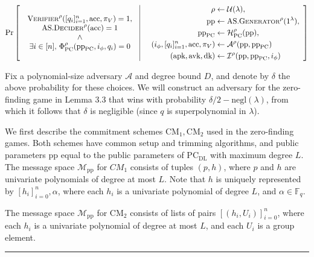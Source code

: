 \documentclass[
]{article}
\newcommand*\Fb{\mathbb{F}}
\newcommand*\Ac{\mathcal{A}}
\newcommand*\Uc{\mathcal{U}}
\newcommand*\Mc{\mathcal{M}}
\newcommand*{\pp}{\mathrm{pp}}
\newcommand*{\acc}{\mathrm{acc}}
\newcommand*{\Verifier}{\mathrm{\text{V\scriptsize ERIFIER}}}
\newcommand*{\Generator}{\mathrm{\text{G{\scriptsize ENERATOR}}}}
\newcommand*{\Decider}{\mathrm{\text{D{\scriptsize ECIDER}}}}
\newcommand*{\AS}{\text{AS}}
\newcommand*{\ASGenerator}{\AS.\Generator}
\newcommand*{\ASDecider}{\AS.\Decider}
\newcommand*{\PC}{\text{PC}}
\newcommand*{\PCDL}{\text{PC}_{\text{DL}}}
\newcommand*{\CM}{\mathrm{\text{CM}}}
\begin{document}
\[
\Pr \left[
  \begin{array}{c|c}
    \begin{array}{c}
      \Verifier^\rho([q_i]_{i=1}^n, \acc, \pi_V) = 1, \\
      \ASDecider^\rho(\acc) = 1 \\
      \wedge \\
      \exists i \in [n],
      \, \Phi^\rho_{\PC}(\pp_\PC, i_\phi, q_i) = 0
    \end{array}
  & \quad
    \begin{aligned}
      \rho &\leftarrow \Uc(\lambda), \\
      \pp &\leftarrow \ASGenerator^\rho(1^\lambda), \\
      \pp_\PC &\leftarrow \mathcal{H}_{\PC}^\rho(\pp), \\
      (i_\phi, [q_i]_{i=1}^n, \acc, \pi_V) &\leftarrow \Ac^\rho(\pp, \pp_{\PC}) \\
      (\text{apk}, \text{avk}, \text{dk}) &\leftarrow \mathcal{I}^\rho(\text{pp}, \text{pp}_{\text{PC}}, i_\phi)
    \end{aligned}
  \end{array}
\right]
\]

Fix a polynomial-size adversary \(\Ac\) and degree bound \(D\), and
denote by \(\delta\) the above probability for these choices. We will
construct an adversary for the zero-finding game in Lemma 3.3 that wins
with probability \(\delta / 2 - \text{negl}(\lambda)\), from which it
follows that \(\delta\) is negligible (since \(q\) is superpolynomial in
\(\lambda\)).

We first describe the commitment schemes \(\CM_1, \CM_2\) used in the
zero-finding games. Both schemes have common setup and trimming
algorithms, and public parameters \(\pp\) equal to the public parameters
of \(\PCDL\) with maximum degree \(L\). The message space
\(\Mc_{\text{pp}}\) for \(CM_1\) consists of tuples \((p,
h)\), where \(p\) and \(h\) are univariate polynomials of degree at most
\(L\). Note that \(h\) is uniquely represented by
\([h_i]_{i=0}^n, \alpha\), where each \(h_i\) is a univariate polynomial
of degree \(L\), and \(\alpha
\in \Fb_q\).

The message space \(\Mc_\pp\) for \(\CM_2\) consists of lists of pairs
\([(h_i, U_i)]_{i=0}^n\), where each \(h_i\) is a univariate polynomial
of degree at most \(L\), and each \(U_i\) is a group element.

\begin{center}\rule{0.5\linewidth}{0.5pt}\end{center}
\end{document}
